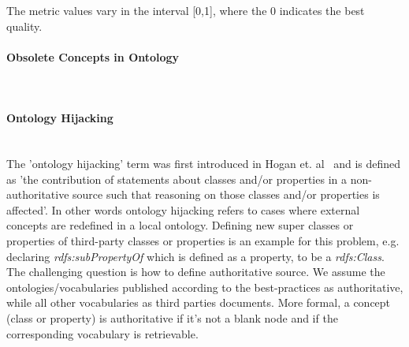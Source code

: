 The metric values vary in the interval [0,1], where  the 0 indicates the best quality.


\paragraph{Obsolete Concepts in Ontology} ~\\
\paragraph{Ontology Hijacking}  ~\\

The 'ontology hijacking' term was first introduced in Hogan et. al~\cite{Hogan08} and is defined as 'the contribution of statements about classes and/or properties in a non-authoritative source such that reasoning on those classes and/or properties is affected'. 
In other words ontology hijacking refers to cases where external concepts are redefined in a local ontology.
Defining new super classes or properties of third-party classes or properties is an example for this problem, e.g. declaring \textit{rdfs:subPropertyOf} which is defined as a property,  to be a \textit{rdfs:Class}. 
The challenging question is how to define authoritative source.
We assume the ontologies/vocabularies published according to the best-practices as authoritative, while all other vocabularies as third parties documents.
More formal, a concept (class or property) is authoritative if it's not a blank node and if the corresponding vocabulary is retrievable.

